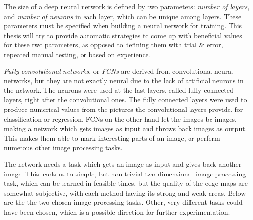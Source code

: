 \documentclass[12pt]{report}
\begin{document}
The size of a deep neural network is defined by two parameters: \textit{number of layers}, and \textit{number of neurons} in each layer, which can be unique among layers. These parameters must be specified when building a neural network for training. This thesis will try to provide automatic strategies to come up with beneficial values for these two parameters, as opposed to defining them with trial \& error, repeated manual testing, or based on experience.\par
\textit{Fully convolutional networks}, or \textit{FCNs} are derived from convolutional neural networks, but they are not exactly neural due to the lack of artificial neurons in the network. The neurons were used at the last layers, called fully connected layers, right after the convolutional ones. The fully connected layers were used to produce numerical values from the pictures the convolutional layers provide, for classification or regression. FCNs on the other hand let the images be images, making a network which gets images as input and throws back images as output. This makes them able to mark interesting parts of an image, or perform numerous other image processing tasks.\par
The network needs a task which gets an image as input and gives back another image. This leads us to simple, but non-trivial two-dimensional image processing task, which can be learned in feasible times, but the quality of the edge maps are somewhat subjective, with each method having its strong and weak areas. Below are the the two chosen image processing tasks. Other, very different tasks could have been chosen, which is a possible direction for further experimentation.
\end{document}
